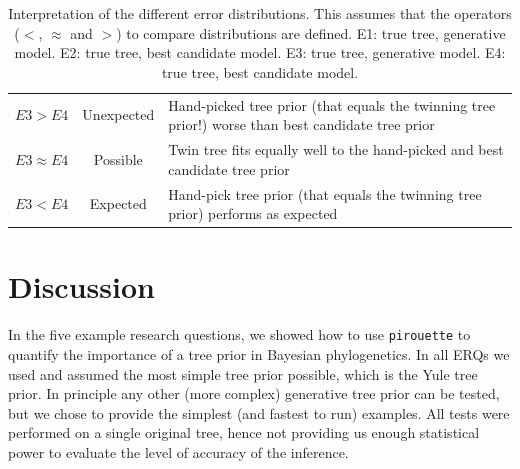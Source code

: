 \documentclass{article}
\begin{document}
\begin{table}
\begin{tabular}{ | r | c | p{9cm} | }
    \hline
    \textbf{$E3 > E4$}       & Unexpected & Hand-picked tree prior (that equals 
      the twinning tree prior!) worse than best candidate tree prior \\
    \textbf{$E3 \approx E4$} & Possible   & Twin tree fits equally well to the 
      hand-picked and best candidate tree prior  \\
    \textbf{$E3 < E4$}       & Expected   & Hand-pick tree prior (that equals 
      the twinning tree prior) performs as expected \\
    \hline
  \end{tabular}
  \caption{
    Interpretation of the different error distributions.
    This assumes that the operators ($<$, $\approx$ and $>$) to compare
    distributions are defined.
    E1: true tree, generative model.
    E2: true tree, best candidate model.
    E3: true tree, generative model.
    E4: true tree, best candidate model.
  }
  \label{tab:interpretation}
\end{table}


\section{Discussion}

In the five example research questions, 
we showed how to use \verb;pirouette; 
to quantify the importance of a tree prior in Bayesian phylogenetics.
In all ERQs we used and assumed the most simple tree prior possible,
which is the Yule tree prior.
In principle any other (more complex) generative tree prior 
can be tested, but we chose to provide the 
simplest (and fastest to run) examples.
All tests were performed on a single original tree, 
hence not providing us enough statistical power to 
evaluate the level of accuracy of the inference. 
\end{document}
